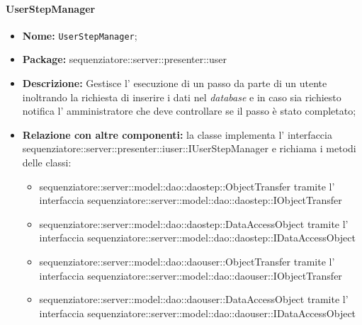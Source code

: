 \paragraph{UserStepManager}
	\begin{itemize}
		\item \textbf{Nome:} \texttt{UserStepManager};
		\item \textbf{Package:} sequenziatore::server::presenter::user
		\item \textbf{Descrizione:} Gestisce l' esecuzione di un passo da parte di un utente inoltrando la richiesta di inserire i dati nel \textit{database} e in caso sia richiesto notifica l' amministratore che deve controllare se il passo è stato completato;
		\item \textbf{Relazione con altre componenti:} la classe implementa l' interfaccia sequenziatore::server::presenter::iuser::IUserStepManager e richiama i metodi delle classi:
		\begin{itemize}
			\item sequenziatore::server::model::dao::daostep::ObjectTransfer tramite l' interfaccia sequenziatore::server::model::dao::daostep::IObjectTransfer
			\item sequenziatore::server::model::dao::daostep::DataAccessObject tramite l' interfaccia sequenziatore::server::model::dao::daostep::IDataAccessObject
			\item sequenziatore::server::model::dao::daouser::ObjectTransfer tramite l' interfaccia sequenziatore::server::model::dao::daouser::IObjectTransfer
			\item sequenziatore::server::model::dao::daouser::DataAccessObject tramite l' interfaccia sequenziatore::server::model::dao::daouser::IDataAccessObject
		\end{itemize}
	\end{itemize}
